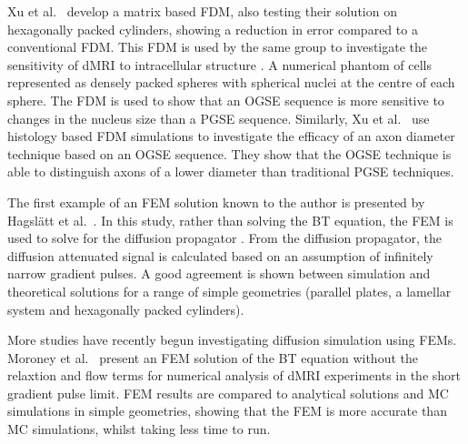 Xu et al.\ \cite{Xu2007} develop a matrix based \ac{FDM}, also testing their solution on hexagonally packed cylinders, showing a reduction in error compared to a conventional FDM.
This \ac{FDM} is used by the same group to investigate the sensitivity of \ac{dMRI} to intracellular structure \cite{Xu2009}.
A numerical phantom of cells represented as densely packed spheres with spherical nuclei at the centre of each sphere.
The FDM is used to show that an \ac{OGSE} sequence is more sensitive to changes in the nucleus size than a \ac{PGSE} sequence.
Similarly, Xu et al.\ \cite{Xu2014} use histology based \ac{FDM} simulations to investigate the efficacy of an axon diameter technique based on an \ac{OGSE} sequence. They show that the \ac{OGSE} technique is able to distinguish axons of a lower diameter than traditional \ac{PGSE} techniques. 

The first example of an \ac{FEM} solution known to the author is presented by Hagsl\"att et al.\ \cite{Hagslatt2003}.
In this study, rather than solving the \ac{BT} equation, the \ac{FEM} is used to solve for the diffusion propagator \cite{Callaghan1991,Price1997}. From the diffusion propagator, the diffusion attenuated signal is calculated based on an assumption of infinitely narrow gradient pulses.
A good agreement is shown between simulation and theoretical solutions for a range of simple geometries (parallel plates, a lamellar system and  hexagonally packed cylinders).

More studies have recently begun investigating diffusion simulation using \acp{FEM}.
Moroney et al.\ \cite{Moroney2013} present an \ac{FEM} solution of the \ac{BT} equation without the relaxtion and flow terms for numerical analysis of \ac{dMRI} experiments in the short gradient pulse limit. \ac{FEM} results are compared to analytical solutions and \ac{MC} simulations in simple geometries, showing that the \ac{FEM} is more accurate than \ac{MC} simulations, whilst taking less time to run.

